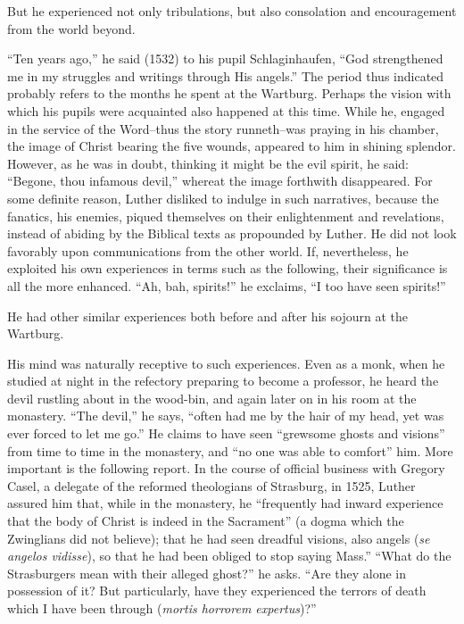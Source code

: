 But he experienced not only tribulations, but also consolation and
encouragement from the world beyond.

“Ten years ago,” he said (1532) to his pupil Schlaginhaufen, “God
strengthened me in my struggles and writings through His angels.”
The period thus indicated probably refers to the months he spent
at the Wartburg. Perhaps the vision with which his pupils were acquainted
also happened at this time. While he, engaged in the service
of the Word--thus the story runneth--was praying in his chamber,
the image of Christ bearing the five wounds, appeared to him in shining
splendor. However, as he was in doubt, thinking it might be the
evil spirit, he said: “Begone, thou infamous devil,” whereat the image
forthwith disappeared. For some definite reason, Luther disliked to
indulge in such narratives, because the fanatics, his enemies, piqued
themselves on their enlightenment and revelations, instead of abiding
by the Biblical texts as propounded by Luther. He did not look
favorably upon communications from the other world. If, nevertheless, he
exploited his own experiences in terms such as the following,
their significance is all the more enhanced. “Ah, bah, spirits!”
he exclaims, “I too have seen spirits!”

He had other similar experiences both before and after his sojourn
at the Wartburg.

His mind was naturally receptive to such experiences. Even as a
monk, when he studied at night in the refectory preparing to become
a professor, he heard the devil rustling about in the wood-bin, and
again later on in his room at the monastery. “The devil,” he says,
“often had me by the hair of my head, yet was ever forced to let
me go.” He claims to have seen “grewsome ghosts and visions” from
time to time in the monastery, and ``no one was able to comfort'' him.
More important is the following report. In the course of official business
with Gregory Casel, a delegate of the reformed theologians of
Strasburg, in 1525, Luther assured him that, while in the monastery,
he “frequently had inward experience that the body of Christ is indeed
in the Sacrament” (a dogma which the Zwinglians did not believe); that
he had seen dreadful visions, also angels (\textit{se angelos vidisse}),
so that he had been obliged to stop saying Mass.” “What do
the Strasburgers mean with their alleged ghost?” he asks. “Are they
alone in possession of it? But particularly, have they experienced the
terrors of death which I have been through (\textit{mortis horrorem expertus})?”

